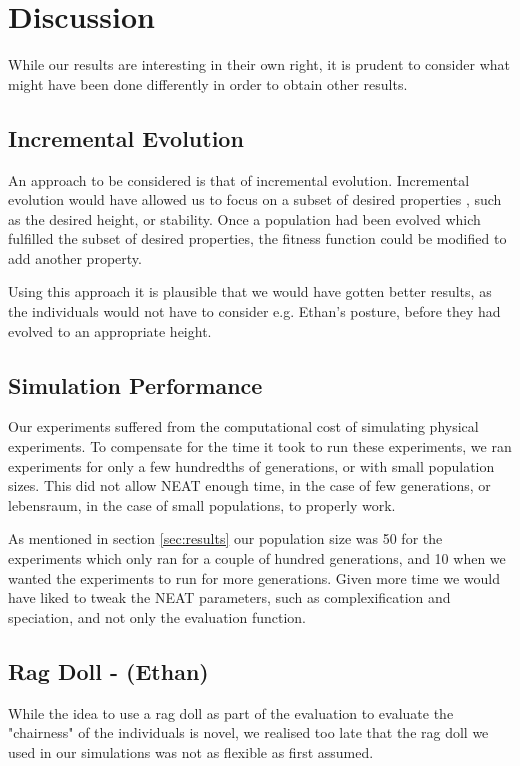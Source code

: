 \section{Discussion}
While our results are interesting in their own right, it is prudent to 
consider what might have been done differently in order to obtain other results.

\subsection{Incremental Evolution}
An approach to be considered is that of incremental evolution. Incremental
evolution would have allowed us to focus on a subset of desired properties ,
such as the desired height, or stability. Once a population had been evolved
which fulfilled the subset of desired properties, the fitness function could be 
modified
to add another property. 

Using this approach it is plausible that we would have gotten better results,
as the individuals would not have to consider e.g. Ethan's posture, before they
had evolved to an appropriate height.

\subsection{Simulation Performance}
Our experiments suffered from the computational cost of simulating physical
experiments. To compensate for the time it took to run these experiments, we
ran experiments for only a few hundredths of generations, or with small
population sizes. This did not allow NEAT enough time, in the case of few 
generations, or lebensraum, in the case of small populations, to properly work.

As mentioned in section \ref{sec:results} our population size was 50 for the 
experiments which only ran for a couple of hundred generations, and 10 when we 
wanted the experiments to run for more generations.
Given more time we would have liked to tweak the NEAT parameters, such as
complexification and speciation, and not only the evaluation function.

\subsection{Rag Doll - (Ethan)}
While the idea to use a rag doll as part of the evaluation to evaluate the 
"chairness" of the individuals is novel, we realised too late that the rag doll 
we used in our simulations was not as flexible as first assumed.

